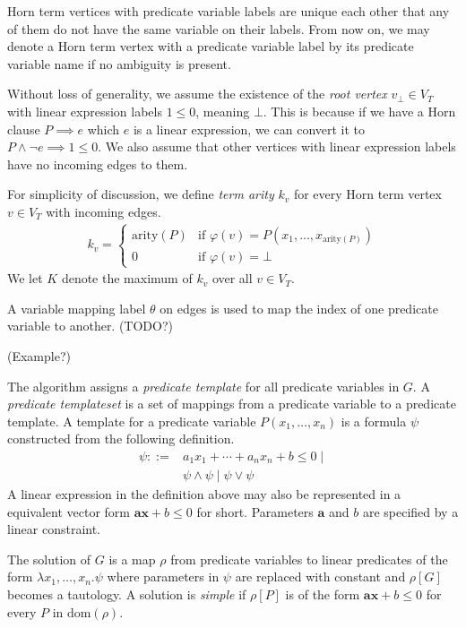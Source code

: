 \documentclass[master,final,12pt]{iscs-thesis}
\begin{document}
Horn term vertices with predicate variable labels are unique each
other that any of them do not have the same variable on their labels.
From now on, we may denote a Horn term vertex with a predicate
variable label by its predicate variable name if no ambiguity is
present.

Without loss of generality, we assume the existence of the \emph{root
  vertex} $v_\bot \in V_T$ with linear expression labels $1 \leq 0$,
meaning $\bot$.  This is because if we have a Horn clause $P \implies
e$ which $e$ is a linear expression, we can convert it to $P \wedge
\neg e \implies 1 \leq 0$.  We also assume that other vertices with
linear expression labels have no incoming edges to them.

For simplicity of discussion, we define \emph{term arity} $k_v$ for
every Horn term vertex $v \in V_T$ with incoming edges.
\begin{align*}
k_v =
\begin{cases}
\mathrm{arity}(P) & \mbox{if } \varphi(v) = P(x_1,...,x_{\mathrm{arity}(P)}) \\
0 & \mbox{if } \varphi(v) = \bot
\end{cases}
\end{align*}
We let $K$ denote the maximum of $k_v$ over all $v \in V_T$.

A variable mapping label $\theta$ on edges is used to map the index of
one predicate variable to another. (TODO?)

(Example?)

The algorithm assigns a \emph{predicate template} for all predicate
variables in $G$. A \emph{predicate templateset} is a set of mappings from
a predicate variable to a predicate template.  A template for a
predicate variable $P(x_1, \ldots, x_n)$ is a formula $\psi$
constructed from the following definition.
\begin{align*}
\psi ::= & a_1 x_1 + \cdots + a_n x_n + b \leq 0 \mid \\
& \psi \wedge \psi \mid \psi \vee \psi
\end{align*}
A linear expression in the definition above may also be represented in
a equivalent vector form $\mathbf{a} \mathbf{x} + b \leq 0$ for short.
Parameters $\mathbf{a}$ and $b$ are specified by a linear constraint.

The solution of $G$ is a map $\rho$ from predicate variables to linear
predicates of the form $\lambda x_1, \ldots ,x_n. \psi$ where
parameters in $\psi$ are replaced with constant and $\rho[G]$ becomes
a tautology.  A solution is \textit{simple} if $\rho[P]$ is of the
form $\mathbf{a} \mathbf{x} + b \leq 0$ for every $P$ in
$\mathrm{dom}(\rho)$.
\end{document}
